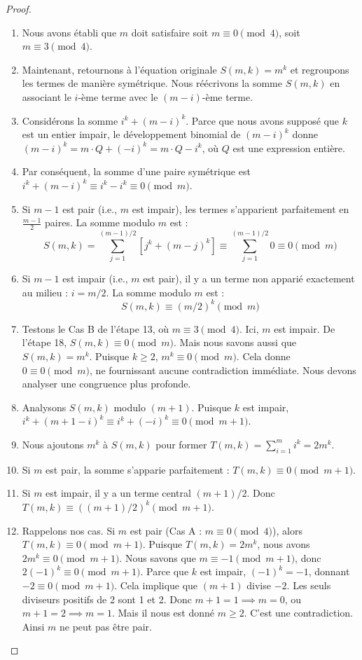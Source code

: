 \documentclass[11pt,a4paper]{article}
\begin{document}
\begin{proof}
\begin{enumerate}
    \item Nous avons établi que $m$ doit satisfaire soit $m \equiv 0 \pmod 4$, soit $m \equiv 3 \pmod 4$.
    \item Maintenant, retournons à l'équation originale $S(m, k) = m^k$ et regroupons les termes de manière symétrique. Nous réécrivons la somme $S(m, k)$ en associant le $i$-ème terme avec le $(m-i)$-ème terme.
    \item Considérons la somme $i^k + (m-i)^k$. Parce que nous avons supposé que $k$ est un entier impair, le développement binomial de $(m-i)^k$ donne $(m-i)^k = m \cdot Q + (-i)^k = m \cdot Q - i^k$, où $Q$ est une expression entière.
    \item Par conséquent, la somme d'une paire symétrique est $i^k + (m-i)^k \equiv i^k - i^k \equiv 0 \pmod m$.
    \item Si $m-1$ est pair (i.e., $m$ est impair), les termes s'apparient parfaitement en $\frac{m-1}{2}$ paires. La somme modulo $m$ est :
    $$S(m, k) = \sum_{j=1}^{(m-1)/2} \left[ j^k + (m-j)^k \right] \equiv \sum_{j=1}^{(m-1)/2} 0 \equiv 0 \pmod m$$
    \item Si $m-1$ est impair (i.e., $m$ est pair), il y a un terme non apparié exactement au milieu : $i = m/2$. La somme modulo $m$ est :
    $$S(m, k) \equiv (m/2)^k \pmod m$$
    \item Testons le Cas B de l'étape 13, où $m \equiv 3 \pmod 4$. Ici, $m$ est impair. De l'étape 18, $S(m, k) \equiv 0 \pmod m$. Mais nous savons aussi que $S(m, k) = m^k$. Puisque $k \ge 2$, $m^k \equiv 0 \pmod m$. Cela donne $0 \equiv 0 \pmod m$, ne fournissant aucune contradiction immédiate. Nous devons analyser une congruence plus profonde.
    \item Analysons $S(m, k)$ modulo $(m+1)$. Puisque $k$ est impair, $i^k + (m+1-i)^k \equiv i^k + (-i)^k \equiv 0 \pmod{m+1}$.
    \item Nous ajoutons $m^k$ à $S(m, k)$ pour former $T(m, k) = \sum_{i=1}^m i^k = 2m^k$.
    \item Si $m$ est pair, la somme s'apparie parfaitement : $T(m, k) \equiv 0 \pmod{m+1}$.
    \item Si $m$ est impair, il y a un terme central $(m+1)/2$. Donc $T(m, k) \equiv ((m+1)/2)^k \pmod{m+1}$.
    \item Rappelons nos cas. Si $m$ est pair (Cas A : $m \equiv 0 \pmod 4$), alors $T(m, k) \equiv 0 \pmod{m+1}$. Puisque $T(m, k) = 2m^k$, nous avons $2m^k \equiv 0 \pmod{m+1}$. Nous savons que $m \equiv -1 \pmod{m+1}$, donc $2(-1)^k \equiv 0 \pmod{m+1}$. Parce que $k$ est impair, $(-1)^k = -1$, donnant $-2 \equiv 0 \pmod{m+1}$. Cela implique que $(m+1)$ divise $-2$. Les seuls diviseurs positifs de 2 sont 1 et 2. Donc $m+1=1 \implies m=0$, ou $m+1=2 \implies m=1$. Mais il nous est donné $m \ge 2$. C'est une contradiction. Ainsi $m$ ne peut pas être pair.

\end{enumerate}
\end{proof}
\end{document}
